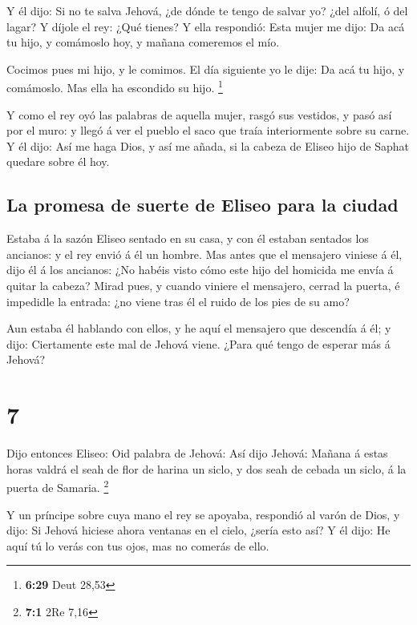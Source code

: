  Y él dijo: Si no te salva Jehová, ¿de dónde te tengo de
salvar yo? ¿del alfolí, ó del lagar?  Y díjole el rey:
¿Qué tienes? Y ella respondió: Esta mujer me dijo: Da acá tu hijo, y
comámoslo hoy, y mañana comeremos el mío.

 Cocimos pues mi hijo, y le comimos. El día siguiente yo
le dije: Da acá tu hijo, y comámoslo. Mas ella ha escondido su hijo.
\footnote{\textbf{6:29} Deut 28,53}

 Y como el rey oyó las palabras de aquella mujer, rasgó
sus vestidos, y pasó así por el muro: y llegó á ver el pueblo el saco
que traía interiormente sobre su carne.  Y él dijo: Así
me haga Dios, y así me añada, si la cabeza de Eliseo hijo de Saphat
quedare sobre él hoy.

\hypertarget{la-promesa-de-suerte-de-eliseo-para-la-ciudad}{%
\subsection{La promesa de suerte de Eliseo para la
ciudad}\label{la-promesa-de-suerte-de-eliseo-para-la-ciudad}}

 Estaba á la sazón Eliseo sentado en su casa, y con él
estaban sentados los ancianos: y el rey envió á él un hombre. Mas antes
que el mensajero viniese á él, dijo él á los ancianos: ¿No habéis visto
cómo este hijo del homicida me envía á quitar la cabeza? Mirad pues, y
cuando viniere el mensajero, cerrad la puerta, é impedidle la entrada:
¿no viene tras él el ruido de los pies de su amo?

 Aun estaba él hablando con ellos, y he aquí el mensajero
que descendía á él; y dijo: Ciertamente este mal de Jehová viene. ¿Para
qué tengo de esperar más á Jehová?

\hypertarget{section-6}{%
\section{7}\label{section-6}}

 Dijo entonces Eliseo: Oid palabra de Jehová: Así dijo
Jehová: Mañana á estas horas valdrá el seah de flor de harina un siclo,
y dos seah de cebada un siclo, á la puerta de Samaria. \footnote{\textbf{7:1}
  2Re 7,16}

 Y un príncipe sobre cuya mano el rey se apoyaba,
respondió al varón de Dios, y dijo: Si Jehová hiciese ahora ventanas en
el cielo, ¿sería esto así? Y él dijo: He aquí tú lo verás con tus ojos,
mas no comerás de ello.


